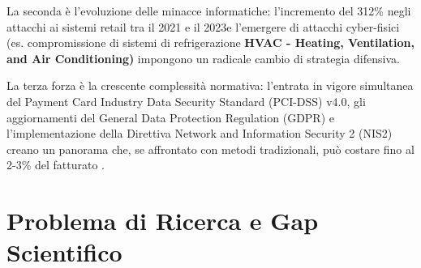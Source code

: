 La seconda è l'evoluzione delle minacce informatiche: l'incremento del 312\% negli attacchi ai sistemi retail tra il 2021 e il 2023\autocite{enisa2024retail}e l'emergere di attacchi cyber-fisici (es. compromissione di sistemi di refrigerazione \textbf{HVAC - Heating, Ventilation, and Air Conditioning)} impongono un radicale cambio di strategia difensiva. 

La terza forza è la crescente complessità normativa: l'entrata in vigore simultanea del Payment Card Industry Data Security Standard (PCI-DSS) v4.0, gli aggiornamenti del General Data Protection Regulation (GDPR) e l'implementazione della Direttiva Network and Information Security 2 (NIS2) creano un panorama che, se affrontato con metodi tradizionali, può costare fino al 2-3\% del fatturato \autocite{ponemon2024compliance}.

\section{Problema di Ricerca e Gap Scientifico}


